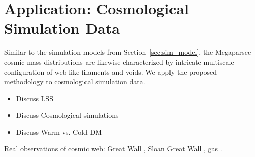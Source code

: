 \documentclass[12pt]{article}
\begin{document}

\section{Application: Cosmological Simulation Data}
\label{sec:application}

Similar to the simulation models from Section~\ref{sec:sim_model}, the Megaparsec cosmic mass distributions are likewise characterized by intricate multiscale configuration of web-like filaments and voids. We apply the proposed methodology to cosmological simulation data.

{\color{red}
\begin{itemize}
\item  Discuss LSS
\item  Discuss Cosmological simulations
\item  Discuss Warm vs. Cold DM
\end{itemize}
Real observations of cosmic web:  Great Wall \citep{geller1989mapping}, Sloan Great Wall \citep{gott2005map}, gas \citep{cantalupo2014cosmic}.}
\end{document}
